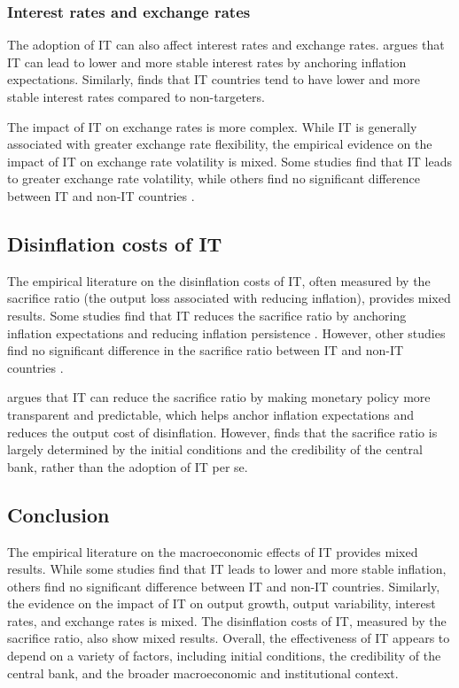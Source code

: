\documentclass{article}
\begin{document}
\subsubsection{Interest rates and exchange rates}

The adoption of IT can also affect interest rates and exchange rates. \citet{svensson2000} argues that IT can lead to lower and more stable interest rates by anchoring inflation expectations. Similarly, \citet{mishkin2000} finds that IT countries tend to have lower and more stable interest rates compared to non-targeters.

The impact of IT on exchange rates is more complex. While IT is generally associated with greater exchange rate flexibility, the empirical evidence on the impact of IT on exchange rate volatility is mixed. Some studies find that IT leads to greater exchange rate volatility, while others find no significant difference between IT and non-IT countries \citep{Ball2000}.

\subsection{Disinflation costs of IT}

The empirical literature on the disinflation costs of IT, often measured by the sacrifice ratio (the output loss associated with reducing inflation), provides mixed results. Some studies find that IT reduces the sacrifice ratio by anchoring inflation expectations and reducing inflation persistence \citep{Mishkin2000}. However, other studies find no significant difference in the sacrifice ratio between IT and non-IT countries \citep{Ball1994}.

\citet{mishkin2000} argues that IT can reduce the sacrifice ratio by making monetary policy more transparent and predictable, which helps anchor inflation expectations and reduces the output cost of disinflation. However, \citet{ball1994} finds that the sacrifice ratio is largely determined by the initial conditions and the credibility of the central bank, rather than the adoption of IT per se.

\subsection{Conclusion}

The empirical literature on the macroeconomic effects of IT provides mixed results. While some studies find that IT leads to lower and more stable inflation, others find no significant difference between IT and non-IT countries. Similarly, the evidence on the impact of IT on output growth, output variability, interest rates, and exchange rates is mixed. The disinflation costs of IT, measured by the sacrifice ratio, also show mixed results. Overall, the effectiveness of IT appears to depend on a variety of factors, including initial conditions, the credibility of the central bank, and the broader macroeconomic and institutional context.



\end{document}
